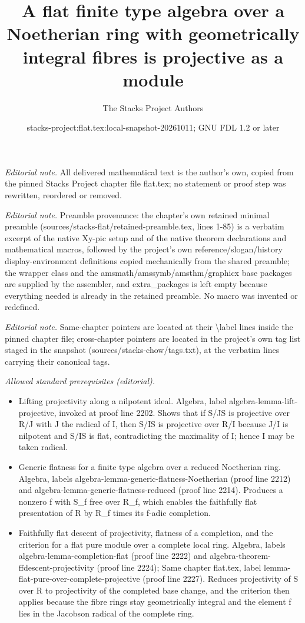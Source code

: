 \documentclass[10pt,a4paper]{amsart}
\title{A flat finite type algebra over a Noetherian ring with geometrically integral fibres is projective as a module}
\author{The Stacks Project Authors}
\date{stacks-project:flat.tex:local-snapshot-20261011; GNU FDL 1.2 or later}
\theoremstyle{plain}
\theoremstyle{definition}
\theoremstyle{remark}
\numberwithin{equation}{subsection}
\begin{document}
\maketitle
\noindent\textit{Editorial note.} All delivered mathematical text is the author's own, copied from the pinned Stacks Project chapter file flat.tex; no statement or proof step was rewritten, reordered or removed.\par\medskip
\noindent\textit{Editorial note.} Preamble provenance: the chapter's own retained minimal preamble (sources/stacks-flat/retained-preamble.tex, lines 1-85) is a verbatim excerpt of the native Xy-pic setup and of the native theorem declarations and mathematical macros, followed by the project's own reference/slogan/history display-environment definitions copied mechanically from the shared preamble; the wrapper class and the amsmath/amssymb/amsthm/graphicx base packages are supplied by the assembler, and extra\_packages is left empty because everything needed is already in the retained preamble. No macro was invented or redefined.\par\medskip
\noindent\textit{Editorial note.} Same-chapter pointers are located at their \textbackslash{}label lines inside the pinned chapter file; cross-chapter pointers are located in the project's own tag list staged in the snapshot (sources/stacks-chow/tags.txt), at the verbatim lines carrying their canonical tags.\par\medskip
\noindent\textit{Allowed standard prerequisites (editorial).}\begin{itemize}
\item Lifting projectivity along a nilpotent ideal. Algebra, label algebra-lemma-lift-projective, invoked at proof line 2202. Shows that if S/JS is projective over R/J with J the radical of I, then S/IS is projective over R/I because J/I is nilpotent and S/IS is flat, contradicting the maximality of I; hence I may be taken radical.
\item Generic flatness for a finite type algebra over a reduced Noetherian ring. Algebra, labels algebra-lemma-generic-flatness-Noetherian (proof line 2212) and algebra-lemma-generic-flatness-reduced (proof line 2214). Produces a nonzero f with S\_f free over R\_f, which enables the faithfully flat presentation of R by R\_f times its f-adic completion.
\item Faithfully flat descent of projectivity, flatness of a completion, and the criterion for a flat pure module over a complete local ring. Algebra, labels algebra-lemma-completion-flat (proof line 2222) and algebra-theorem-ffdescent-projectivity (proof line 2224); Same chapter flat.tex, label lemma-flat-pure-over-complete-projective (proof line 2227). Reduces projectivity of S over R to projectivity of the completed base change, and the criterion then applies because the fibre rings stay geometrically integral and the element f lies in the Jacobson radical of the complete ring.
\end{itemize}\medskip
\end{document}

